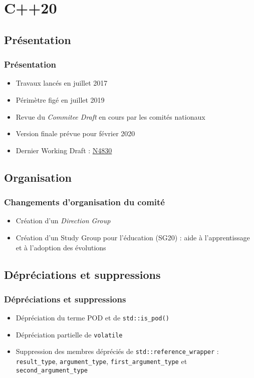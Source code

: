 \documentclass[C++.tex]{subfiles}
\begin{document}
\section{C++20}
\subsection*{Présentation}
\begin{frame}
	\frametitle{Présentation}
	\begin{itemize}
		\item Travaux lancés en juillet 2017
		\item Périmètre figé en juillet 2019
		\item Revue du \textit{Commitee Draft} en cours par les comités nationaux
		\item Version finale prévue pour février 2020
		\item Dernier Working Draft : \href{https://github.com/cplusplus/draft/blob/master/papers/n4830.pdf}{N4830}
	\end{itemize}
\end{frame}

\subsection*{Organisation}
\begin{frame}
	\frametitle{Changements d'organisation du comité}
	\begin{itemize}
		\item Création d'un \textit{Direction Group}
		\item Création d'un Study Group pour l'éducation (SG20) : aide à l'apprentissage et à l'adoption des évolutions
	\end{itemize}

	\centering

\end{frame}

\subsection*{Dépréciations et suppressions}
\begin{frame}[fragile]
	\frametitle{Dépréciations et suppressions}
	\begin{itemize}
		\item Dépréciation du terme POD et de \lstinline|std::is_pod()|
		\item Dépréciation partielle de \lstinline|volatile|


		\item Suppression des membres dépréciés de \lstinline|std::reference_wrapper| : \lstinline|result_type|, \lstinline|argument_type|, \lstinline|first_argument_type| et \lstinline|second_argument_type|
	\end{itemize}
\end{frame}
\end{document}
